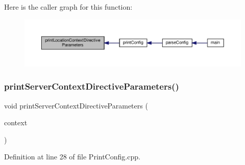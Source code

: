 Here is the caller graph for this function\+:
\nopagebreak
\begin{figure}[H]
\begin{center}
\leavevmode
\includegraphics[width=350pt]{classft_1_1_print_config_a8862bb68558be4a7286c6ce05db3fa4d_icgraph}
\end{center}
\end{figure}
\mbox{\label{classft_1_1_print_config_a5f88f0aae9e0678e2637ae329b74739e}} 
\subsubsection{\texorpdfstring{print\+Server\+Context\+Directive\+Parameters()}{printServerContextDirectiveParameters()}}
{\footnotesize\ttfamily void print\+Server\+Context\+Directive\+Parameters (\begin{DoxyParamCaption}\item[{\hyperlink{classft_1_1_server_block}{ft\+::\+Server\+Block} \&}]{context }\end{DoxyParamCaption})\hspace{0.3cm}{\ttfamily [static]}}



Definition at line 28 of file Print\+Config.\+cpp.


